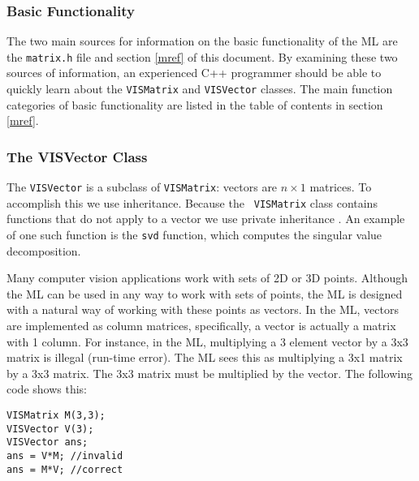 \subsubsection{Basic Functionality}
The two main sources for information on the basic functionality of
the ML are the {\tt matrix.h} file and section \ref{mref} of this document.
By examining these two sources of information, an experienced C++ programmer
should be able to quickly learn about the {\tt VISMatrix} and {\tt VISVector} classes.
The main function categories of basic functionality are listed in the table of
contents in section \ref{mref}.

\subsubsection{The VISVector Class}
The {\tt VISVector} is a subclass of {\tt VISMatrix}: vectors are $n\times1$ 
matrices.  To accomplish this we use inheritance.  Because the {\tt 
VISMatrix} class contains functions that do not apply to a vector we use 
private inheritance \cite{meyers}.  An example of one such function is 
the {\tt svd} function, which computes the singular value 
decomposition.

Many computer vision applications work with sets of 2D or 3D points.  
Although the ML can be used in any way to work with sets of points, 
the ML is designed with a natural way of working with these points as 
vectors.  In the ML, vectors are implemented as column matrices, 
specifically, a vector is actually a matrix with 1 column.  For 
instance, in the ML, multiplying a 3 element vector by a 3x3 matrix is 
illegal (run-time error).  
The ML sees this as multiplying a 3x1 matrix by a 3x3 
matrix.  The 3x3 matrix must be multiplied by the vector.  The 
following code shows this:
\begin{list}{}{\setlength{\partopsep}{-1in}
\setlength{\topsep}{0in} \setlength{\labelwidth}{1in}
\setlength{\leftmargin}{0.5in} \setlength{\labelsep}{0.2in}}
 \item {\tt VISMatrix M(3,3);}\\
{\tt VISVector V(3);}\\
{\tt VISVector ans;}\\
{\tt ans = V*M; //invalid}\\
{\tt ans = M*V; //correct}
\end{list}

